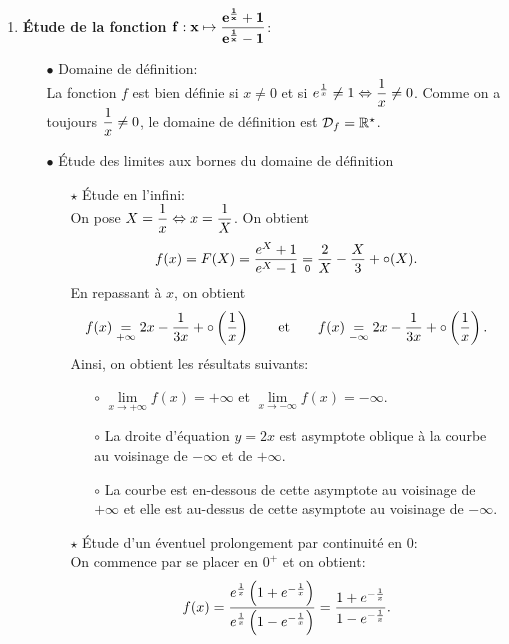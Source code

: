 \documentclass[a4paper, 11pt,reqno]{article}
\begin{document}
\begin{correction}  \;
	\begin{enumerate}
		\item \textbf{\'Etude de la fonction $\mathbf{f: x\mapsto \displaystyle\frac{e^{\frac{1}{x}}+1   }{e^{\frac{1}{x}}-1}}$}:
		      \begin{itemize}
			      \item[$\bullet$] Domaine de d\'efinition:\\
			            \noindent La fonction $f$ est bien d\'efinie si $x\not= 0$ et si $e^{\frac{1}{x}}\not= 1\Leftrightarrow \displaystyle\frac{1}{x}\not= 0$. Comme on a toujours $\displaystyle\frac{1}{x}\not= 0$, le domaine de d\'efinition est $\mathcal{D}_f=\mathbb{R}^{\star}$.
			      \item[$\bullet$]  \'Etude des limites aux bornes du domaine de d\'efinition
			            \begin{itemize}
				            \item[$\star$] \'Etude en l'infini:\\
				                  \noindent On pose $X=\displaystyle\frac{1}{x}\Leftrightarrow x=\displaystyle\frac{1}{X}$. On obtient
				                  $$f(x)=F(X)=\displaystyle\frac{e^X+1}{e^X-1}\underset{0}{=} \displaystyle\frac{2}{X}-\displaystyle\frac{X}{3}+\circ(X).$$
				                  En repassant \`a $x$, on obtient
				                  $$f(x)\underset{+\infty}{=} 2x-\displaystyle\frac{1}{3x}+\circ\left( \displaystyle\frac{1}{x}\right)\qquad \hbox{et}\qquad f(x)\underset{-\infty}{=} 2x-\displaystyle\frac{1}{3x}+\circ\left( \displaystyle\frac{1}{x}\right).$$
				                  Ainsi, on obtient les r\'esultats suivants:
				                  \begin{itemize}
					                  \item[$\circ$] $\lim\limits_{x\to +\infty} f(x)=+\infty$ et $\lim\limits_{x\to -\infty} f(x)=-\infty$.
					                  \item[$\circ$] La droite d'\'equation $y=2x$ est asymptote oblique \`a la courbe au voisinage de $-\infty$ et de $+\infty$.
					                  \item[$\circ$] La courbe est en-dessous de cette asymptote au voisinage de $+\infty$ et elle est au-dessus de cette asymptote au voisinage de $-\infty$.
				                  \end{itemize}
				            \item[$\star$] \'Etude d'un \'eventuel prolongement par continuit\'e en 0:\\
				                  \noindent On commence par se placer en $0^+$ et on obtient:
				                  $$f(x)=\displaystyle\frac{e^{\frac{1}{x}}\left( 1+e^{-\frac{1}{x}} \right) }{e^{\frac{1}{x}}\left( 1-e^{-\frac{1}{x}} \right)}=\displaystyle\frac{1+e^{-\frac{1}{x}}}{1-e^{-\frac{1}{x}}}.$$

\end{itemize}
\end{itemize}
\end{enumerate}
\end{correction}
\end{document}
